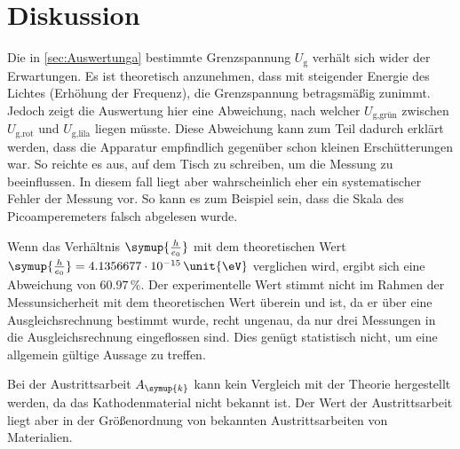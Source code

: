 \section{Diskussion}
\label{sec:Diskussion}

Die in \autoref{sec:Auswertunga} bestimmte Grenzspannung $U_{\text{g}}$ verhält sich wider der Erwartungen. Es ist theoretisch anzunehmen, dass mit steigender Energie des Lichtes (Erhöhung der Frequenz), die Grenzspannung betragsmäßig 
zunimmt. Jedoch zeigt die Auswertung hier eine Abweichung, nach welcher $U_{\text{g,grün}}$ zwischen $U_{\text{g,rot}}$ und $U_{\text{g,lila}}$ liegen müsste. 
Diese Abweichung kann zum Teil dadurch erklärt werden, dass die Apparatur empfindlich gegenüber schon kleinen Erschütterungen war. So reichte es aus, auf dem Tisch zu schreiben, um die Messung zu beeinflussen.
In diesem fall liegt aber wahrscheinlich eher ein systematischer Fehler der Messung vor. So kann es zum Beispiel sein, dass die Skala des Picoamperemeters 
falsch abgelesen wurde.

Wenn das Verhältnis $\symup{\frac{h}{e_0}}$ mit dem theoretischen Wert $\symup{\frac{h}{e_0}} = 4.1356677 \cdot 10^{-15} \,\unit{\eV}$ verglichen wird, 
ergibt sich eine Abweichung von $60.97\,\%$. Der experimentelle Wert stimmt nicht im Rahmen der Messunsicherheit mit dem theoretischen Wert 
überein und ist, da er über eine Ausgleichsrechnung bestimmt wurde, recht ungenau, da nur drei Messungen 
in die Ausgleichsrechnung eingeflossen sind. Dies genügt statistisch nicht, um eine allgemein gültige Aussage zu treffen. 

Bei der Austrittsarbeit $A_{\symup{k}}$ kann kein Vergleich mit der Theorie hergestellt werden, da das Kathodenmaterial nicht bekannt ist. Der Wert der 
Austrittsarbeit liegt aber in der Größenordnung von bekannten Austrittsarbeiten von Materialien. 

